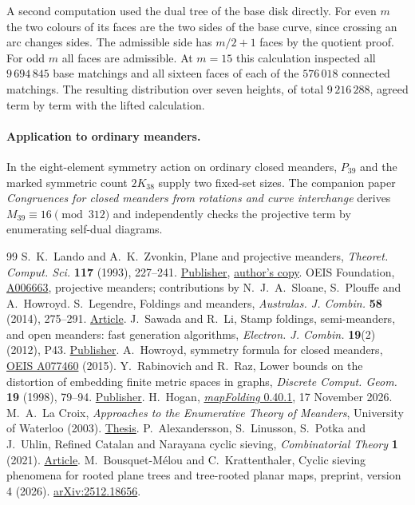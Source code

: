 A second computation used the dual tree of the base disk directly.
For even \(m\) the two colours of its faces are the two sides of the
base curve, since crossing an arc changes sides. The admissible side
has \(m/2+1\) faces by the quotient proof. For odd \(m\) all faces are
admissible. At \(m=15\) this calculation inspected all \(9\,694\,845\)
base matchings and all sixteen faces of each of the \(576\,018\)
connected matchings. The resulting distribution over seven heights,
of total \(9\,216\,288\), agreed term by term with the lifted calculation.

\paragraph{Application to ordinary meanders.} In the eight-element symmetry action on ordinary closed meanders, \(P_{39}\) and the marked symmetric count \(2K_{38}\) supply two fixed-set sizes. The companion paper \emph{Congruences for closed meanders from rotations and curve interchange} derives \(M_{39}\equiv16\pmod{312}\) and independently checks the projective term by enumerating self-dual diagrams.

\begin{thebibliography}{99}\small
{} S.~K.~Lando and A.~K.~Zvonkin, Plane and projective meanders, \emph{Theoret. Comput. Sci.} \textbf{117} (1993), 227--241. \href{https://doi.org/10.1016/0304-3975(93)90316-L}{Publisher}, \href{https://www.labri.fr/perso/zvonkin/Research/proj-mean.pdf}{author's copy}.
 OEIS Foundation, \href{https://oeis.org/A006663}{A006663}, projective meanders; contributions by N.~J.~A.~Sloane, S.~Plouffe and A.~Howroyd.
 S.~Legendre, Foldings and meanders, \emph{Australas. J. Combin.} \textbf{58} (2014), 275--291. \href{https://ajc.maths.uq.edu.au/pdf/58/ajc_v58_p275.pdf}{Article}.
 J.~Sawada and R.~Li, Stamp foldings, semi-meanders, and open meanders: fast generation algorithms, \emph{Electron. J. Combin.} \textbf{19}(2) (2012), P43. \href{https://doi.org/10.37236/2404}{Publisher}.
 A.~Howroyd, symmetry formula for closed meanders, \href{https://oeis.org/A077460}{OEIS A077460} (2015).
 Y.~Rabinovich and R.~Raz, Lower bounds on the distortion of embedding finite metric spaces in graphs, \emph{Discrete Comput. Geom.} \textbf{19} (1998), 79--94. \href{https://doi.org/10.1007/PL00009336}{Publisher}.
 H.~Hogan, \href{https://pypi.org/project/mapFolding/0.40.1/}{\emph{mapFolding} 0.40.1}, 17 November 2026.
 M.~A.~La Croix, \emph{Approaches to the Enumerative Theory of Meanders}, University of Waterloo (2003). \href{https://www.math.uwaterloo.ca/~malacroi/Latex/Meanders.pdf}{Thesis}.
 P.~Alexandersson, S.~Linusson, S.~Potka and J.~Uhlin,
Refined Catalan and Narayana cyclic sieving, \emph{Combinatorial Theory}
\textbf{1} (2021). \href{https://doi.org/10.5070/C61055513}{Article}.
 M.~Bousquet-M\'elou and C.~Krattenthaler,
Cyclic sieving phenomena for rooted plane trees and tree-rooted planar maps, preprint,
version 4 (2026). \href{https://arxiv.org/abs/2512.18656v4}{arXiv:2512.18656}.
\end{thebibliography}

